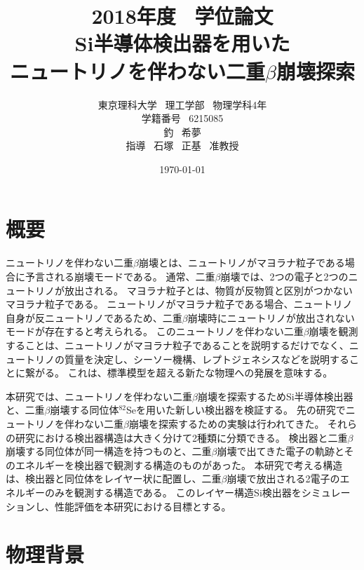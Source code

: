 \documentclass[a4paper,10pt]{jreport}
\title{
2018年度 \ 学位論文 \\
\vspace{20mm}
\huge Si半導体検出器を用いた \\
\huge ニュートリノを伴わない二重$\beta$崩壊探索
\vspace{50mm}
}
\author{
東京理科大学 \ 理工学部 \ 物理学科4年 \\
学籍番号 \ 6215085 \vspace{5mm} \\
\LARGE 釣 \ 希夢 \vspace{5mm} \\
指導 \ 石塚 \ 正基 \ 准教授 \vspace{5mm}
}
\date{\today}
\begin{document}
\maketitle

\chapter*{概要}

ニュートリノを伴わない二重$\beta$崩壊とは、ニュートリノがマヨラナ粒子である場合に予言される崩壊モードである。
通常、二重$\beta$崩壊では、2つの電子と2つのニュートリノが放出される。
マヨラナ粒子とは、物質が反物質と区別がつかないマヨラナ粒子である。
ニュートリノがマヨラナ粒子である場合、ニュートリノ自身が反ニュートリノであるため、二重$\beta$崩壊時にニュートリノが放出されないモードが存在すると考えられる。
このニュートリノを伴わない二重$\beta$崩壊を観測することは、ニュートリノがマヨラナ粒子であることを説明するだけでなく、ニュートリノの質量を決定し、シーソー機構、レプトジェネシスなどを説明することに繋がる。
これは、標準模型を超える新たな物理への発展を意味する。

本研究では、ニュートリノを伴わない二重$\beta$崩壊を探索するためSi半導体検出器と、二重$\beta$崩壊する同位体$^{82}$Seを用いた新しい検出器を検証する。
先の研究でニュートリノを伴わない二重$\beta$崩壊を探索するための実験は行われてきた。
それらの研究における検出器構造は大きく分けて2種類に分類できる。
検出器と二重$\beta$崩壊する同位体が同一構造を持つものと、二重$\beta$崩壊で出てきた電子の軌跡とそのエネルギーを検出器で観測する構造のものがあった。
本研究で考える構造は、検出器と同位体をレイヤー状に配置し、二重$\beta$崩壊で放出される2電子のエネルギーのみを観測する構造である。
このレイヤー構造Si検出器をシミュレーションし、性能評価を本研究における目標とする。

\clearpage




\tableofcontents
\thispagestyle{empty}
\clearpage



\listoftables
\thispagestyle{empty}
\clearpage



\listoffigures
\thispagestyle{empty}
\clearpage





\chapter{物理背景}
\end{document}
